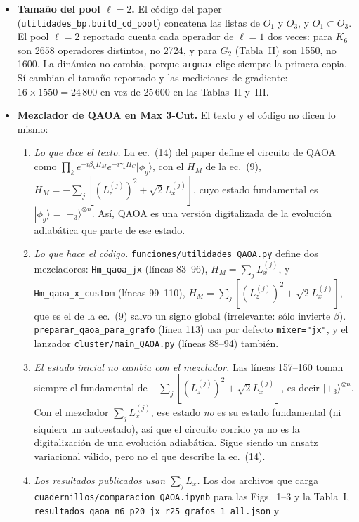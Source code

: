 \documentclass[11pt,a4paper]{article}
\renewcommand{\ket}[1]{|#1\rangle}
\begin{document}
\begin{itemize}
\item \textbf{Tamaño del pool $\ell=2$.} El código del paper
  (\texttt{utilidades\_bp.build\_cd\_pool}) concatena las listas de $O_1$ y $O_3$, y $O_1\subset O_3$.
  El pool $\ell=2$ reportado cuenta cada operador de $\ell=1$ dos veces: para $K_6$ son 2658
  operadores distintos, no 2724, y para $G_2$ (Tabla~II) son 1550, no 1600. La dinámica no cambia,
  porque \texttt{argmax} elige siempre la primera copia. Sí cambian el tamaño reportado y las
  mediciones de gradiente: $16\times1550=24\,800$ en vez de $25\,600$ en las Tablas~II y~III.
\item \textbf{Mezclador de QAOA en Max 3-Cut.} El texto y el código no dicen lo mismo:
  \begin{enumerate}
  \item \emph{Lo que dice el texto.} La ec.~(14) del paper define el circuito de QAOA como
    $\prod_k e^{-i\beta_kH_M}e^{-i\gamma_kH_C}\ket{\phi_g}$, con el $H_M$ de la ec.~(9),
    $H_M=-\sum_j[(L_z^{(j)})^2+\sqrt2L_x^{(j)}]$, cuyo estado fundamental es
    $\ket{\phi_g}=\ket{+_3}^{\otimes n}$. Así, QAOA es una versión digitalizada de la evolución
    adiabática que parte de ese estado.
  \item \emph{Lo que hace el código.} \texttt{funciones/utilidades\_QAOA.py} define dos mezcladores:
    \texttt{Hm\_qaoa\_jx} (líneas 83--96), $H_M=\sum_jL_x^{(j)}$, y \texttt{Hm\_qaoa\_x\_custom}
    (líneas 99--110), $H_M=\sum_j[(L_z^{(j)})^2+\sqrt2L_x^{(j)}]$, que es el de la ec.~(9) salvo un
    signo global (irrelevante: sólo invierte $\beta$). \texttt{preparar\_qaoa\_para\_grafo} (línea 113)
    usa por defecto \texttt{mixer="jx"}, y el lanzador \texttt{cluster/main\_QAOA.py} (líneas 88--94)
    también.
  \item \emph{El estado inicial no cambia con el mezclador.} Las líneas 157--160 toman siempre el
    fundamental de $-\sum_j[(L_z^{(j)})^2+\sqrt2L_x^{(j)}]$, es decir $\ket{+_3}^{\otimes n}$. Con el
    mezclador $\sum_jL_x^{(j)}$, ese estado \emph{no} es su estado fundamental (ni siquiera un
    autoestado), así que el circuito corrido ya no es la digitalización de una evolución adiabática.
    Sigue siendo un ansatz variacional válido, pero no el que describe la ec.~(14).
  \item \emph{Los resultados publicados usan $\sum_jL_x$.} Los dos archivos que carga
    \texttt{cuadernillos/}\allowbreak\texttt{comparacion\_QAOA.ipynb} para las Figs.~1--3 y la
    Tabla~I,
    \texttt{resultados\_qaoa\_n6\_p20\_jx\_r25\_grafos\_1\_all.json} y

\end{enumerate}
\end{itemize}
\end{document}
